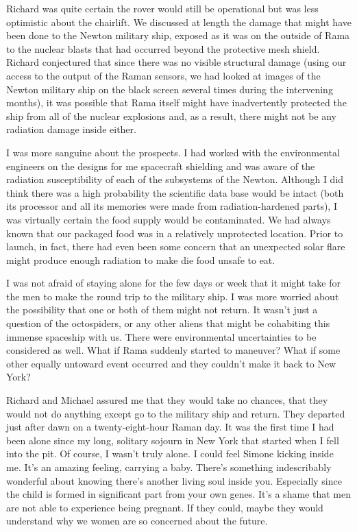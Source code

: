 \documentclass[]{article}
\begin{document}
Richard was quite certain the rover would still be operational but was less optimistic about the chairlift.  We discussed at length the damage that might have been done to the Newton military ship, exposed as it was on the outside of Rama to the nuclear blasts that had occurred beyond the protective mesh shield.  Richard conjectured that since there was no visible structural damage (using our access to the output of the Raman sensors, we had looked at images of the Newton military ship on the black screen several times during the intervening months), it was possible that Rama itself might have inadvertently protected the ship from all of the nuclear explosions and, as a result, there might not be any radiation damage inside either.

I was more sanguine about the prospects.  I had worked with the environmental engineers on the designs for me spacecraft shielding and was aware of the radiation susceptibility of each of the subsystems of the Newton.  Although I did think there was a high probability the scientific data base would be intact (both its processor and all its memories were made from radiation-hardened parts), I was virtually certain the food supply would be contaminated.  We had always known that our packaged food was in a relatively unprotected location.  Prior to launch, in fact, there had even been some concern that an unexpected solar flare might produce enough radiation to make die food unsafe to eat.

I was not afraid of staying alone for the few days or week that it might take for the men to make the round trip to the military ship.  I was more worried about the possibility that one or both of them might not return.  It wasn’t just a question of the octospiders, or any other aliens that might be cohabiting this immense spaceship with us.  There were environmental uncertainties to be considered as well.  What if Rama suddenly started to maneuver? What if some other equally untoward event occurred and they couldn’t make it back to New York?

Richard and Michael assured me that they would take no chances, that they would not do anything except go to the military ship and return.  They departed just after dawn on a twenty-eight-hour Raman day.  It was the first time I had been alone since my long, solitary sojourn in New York that started when I fell into the pit.  Of course, I wasn’t truly alone.  I could feel Simone kicking inside me.  It’s an amazing feeling, carrying a baby.  There’s something indescribably wonderful about knowing there’s another living soul inside you.  Especially since the child is formed in significant part from your own genes.  It’s a shame that men are not able to experience being pregnant.  If they could, maybe they would understand why we women are so concerned about the future.
\end{document}
